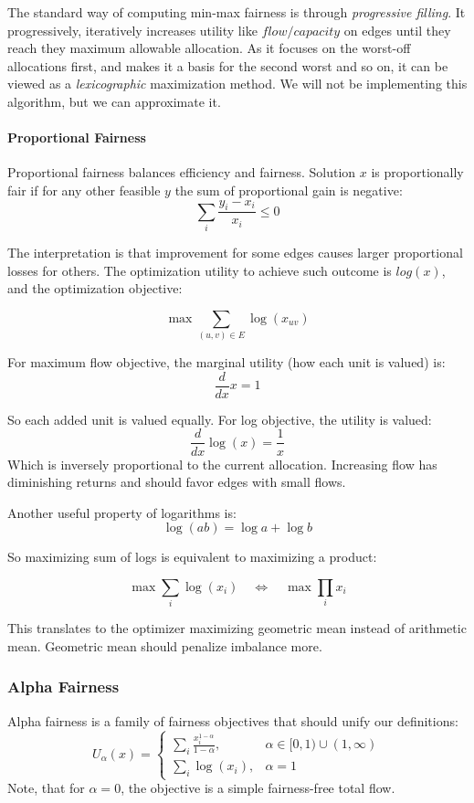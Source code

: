 \documentclass[12pt, openany]{article}
\begin{document}
The standard way of computing min-max fairness is through \textit{progressive filling}. It progressively, iteratively increases utility like \(flow / capacity\) on edges until they reach they maximum allowable allocation. As it focuses on the worst-off allocations first, and makes it a basis for the second worst and so on, it can be viewed as a \textit{lexicographic} maximization method. We will not be implementing this algorithm, but we can approximate it.

\paragraph{Proportional Fairness}

Proportional fairness balances efficiency and fairness. Solution $x$ is proportionally fair if for any other feasible $y$ the sum of proportional gain is negative:
\[
\sum_i \frac{y_i - x_i}{x_i} \le 0
\]

The interpretation is that improvement for some edges causes larger proportional losses for others. The optimization utility to achieve such outcome is $log(x)$, and the optimization objective:

\[
\max \sum_{(u,v)\in E}\log(x_{uv})
\]

For maximum flow objective, the marginal utility (how each unit is valued) is:
\[
\frac{d}{dx}x = 1
\]

So each added unit is valued equally. For log objective, the utility is valued:
\[
\frac{d}{dx}\log(x)=\frac{1}{x}
\]
Which is inversely proportional to the current allocation. Increasing flow has diminishing returns and should favor edges with small flows.

Another useful property of logarithms is:
\[
\log(ab)=\log a + \log b
\]

So maximizing sum of logs is equivalent to maximizing a product:

\[
\max \sum_i \log(x_i)
\quad\Longleftrightarrow\quad
\max \prod_i x_i
\]

This translates to the optimizer maximizing geometric mean instead of arithmetic mean. Geometric mean should penalize imbalance more.

\subsubsection{Alpha Fairness}
Alpha fairness is a family of fairness objectives that should unify our definitions:
\[
U_\alpha(x)=
\begin{cases}
\displaystyle \sum_i \frac{x_i^{1-\alpha}}{1-\alpha},
& \alpha \in [0,1)\cup(1,\infty) \\[1 em]
\displaystyle \sum_i \log(x_i),
& \alpha = 1
\end{cases}
\]
Note, that for $\alpha = 0$, the objective is a simple fairness-free total flow.
\end{document}
